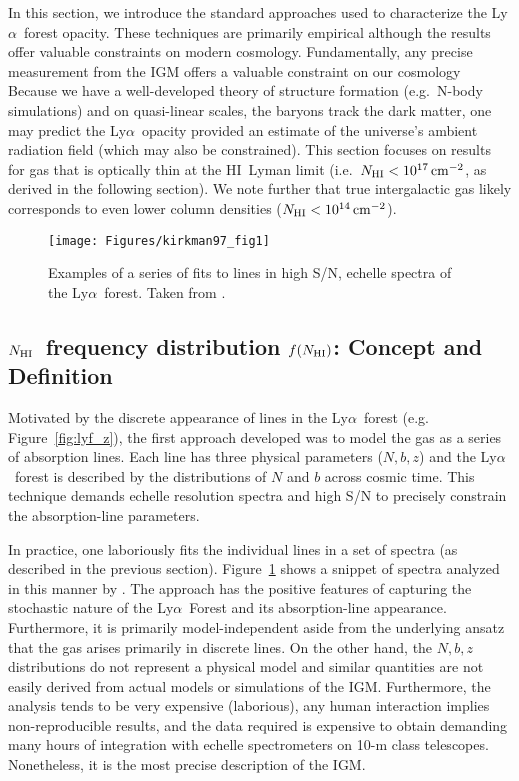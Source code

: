 \documentclass[graybox]{svmult}
\newcommand{\HI}{H{\sc I}}
\def\lya{Ly$\alpha$}
\newcommand{\mnhi}{N_{\rm HI}}
\newcommand{\nhi}{$\mnhi$}
\def\cm#1{\, {\rm cm^{#1}}}
\def\mfnhi{f(\mnhi)}
\def\fnhi{$\mfnhi$}
\begin{document}
In this section, we introduce
the standard approaches used to characterize the \lya\ 
forest opacity.  These techniques are primarily empirical
although the results offer valuable constraints on modern
cosmology.
Fundamentally, any precise measurement from the IGM offers a 
 valuable constraint on our cosmology
Because we have a well-developed theory of structure formation (e.g.\ N-body
simulations) and
on quasi-linear scales, the baryons track the dark matter,
one may predict the \lya\ opacity provided an estimate
of the universe's ambient
radiation field (which may also be constrained).
This section focuses on results for gas that is
optically thin at the \HI\ Lyman limit (i.e.\ $\mnhi<10^{17} \cm{-2}$,
as derived in the following section).  We note further
that true intergalactic gas 
likely corresponds to even lower column densities
($\mnhi <10^{14} \cm{-2}$).

%
\begin{figure}[b]
\sidecaption
\texttt{[image: Figures/kirkman97\_fig1]}
%
%
\caption{Examples of a series of fits to lines in
high S/N, echelle spectra of the \lya\ forest.
Taken from \cite{kt97}.
}
\label{fig:kirkman97_fig1}       %
\end{figure}
        
\subsection{\nhi\ frequency distribution \fnhi: Concept and Definition}

Motivated by the discrete appearance of lines in the 
\lya\ forest (e.g. Figure~\ref{fig:lyf_z}), the
first approach developed was to model the gas
as a series of absorption lines.  Each line has
three physical parameters ($N,b,z$) and 
the \lya\ forest is described by the distributions of
$N$ and $b$ across cosmic time.  This technique demands
echelle resolution spectra and high S/N to precisely 
constrain the absorption-line parameters.

In practice, one laboriously fits the individual lines in a set of
spectra (as described in the previous section).  
Figure~\ref{fig:kirkman97_fig1} shows a snippet of spectra
analyzed in this manner by \cite{kt97}.  The approach has the
positive features of 
capturing the stochastic nature of the \lya\ Forest and
its absorption-line appearance.  Furthermore, it is 
primarily model-independent aside from the underlying
ansatz that the gas arises primarily in discrete lines.
On the other hand, the $N,b,z$ distributions do not
represent a physical model and similar quantities are not
easily derived from actual models or simulations of the IGM.
Furthermore, the analysis tends to 
be very expensive (laborious), any
human interaction implies non-reproducible results,
and the data required is expensive to obtain
demanding many hours of integration with 
echelle spectrometers on 10-m class telescopes.
Nonetheless, it is the most precise description of the IGM.
\end{document}
